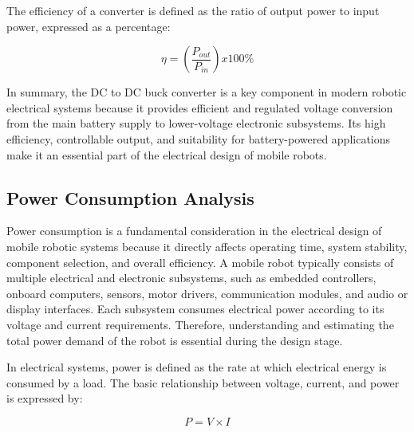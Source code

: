 The efficiency of a converter is defined as the ratio of output power to input power, expressed as a percentage:

\begin{equation}
    \eta = \left( \frac{P_{out}}{P_{in}} \right) x 100\%
\end{equation}



In summary, the DC to DC buck converter is a key component in modern robotic electrical systems because it provides efficient and regulated voltage conversion from the main battery supply to lower-voltage electronic subsystems. Its high efficiency, controllable output, and suitability for battery-powered applications make it an essential part of the electrical design of mobile robots.


\subsection{Power Consumption Analysis}

Power consumption is a fundamental consideration in the electrical design of mobile robotic systems because it directly affects operating time, system stability, component selection, and overall efficiency. A mobile robot typically consists of multiple electrical and electronic subsystems, such as embedded controllers, onboard computers, sensors, motor drivers, communication modules, and audio or display interfaces. Each subsystem consumes electrical power according to its voltage and current requirements. Therefore, understanding and estimating the total power demand of the robot is essential during the design stage.

In electrical systems, power is defined as the rate at which electrical energy is consumed by a load. The basic relationship between voltage, current, and power is expressed by:

\begin{equation}
    P = V \times I
\end{equation}


